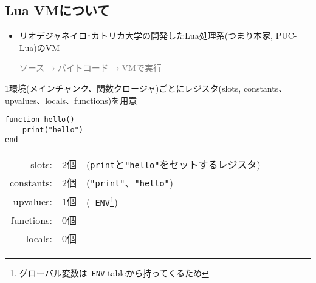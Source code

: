 \subsection{Lua VMについて}
\begin{frame}
\frametitlesubs
\begin{itemize}
	\item リオデジャネイロ･カトリカ大学の開発したLua処理系(つまり本家, PUC-Lua)のVM

		\begin{center}
			\textcolor<2->{gray}{ソース$\rightarrow${バイトコード}$\rightarrow$VMで実行}
		\end{center}
\end{itemize}
\vspace{-1\zw}
\begin{center}
	\vspace{1\zw}

\end{center}
\end{frame}
\begin{frame}[fragile]
	\frametitlesubs
	1環境(メインチャンク、関数クロージャ)ごとにレジスタ(slots, constants、upvalues、locals、functions)を用意

	\begin{lstlisting}[language={[5.2]lua},numbers=none]
function hello()
	print("hello")
end\end{lstlisting}

\begin{table}[h]
	\centering
	\begin{tabular}{rcl}
		slots: &2個&(\lstinline|print|と\lstinline|"hello"|をセットするレジスタ)\\
		constants:& 2個&(\lstinline|"print"|、\lstinline|"hello"|)\\
		upvalues:& 1個&(\lstinline|_ENV|\footnote[frame]{グローバル変数は\lstinline|_ENV| tableから持ってくるため})\\
		functions:& 0個&\\
		locals:& 0個&
	\end{tabular}
\end{table}
\end{frame}
